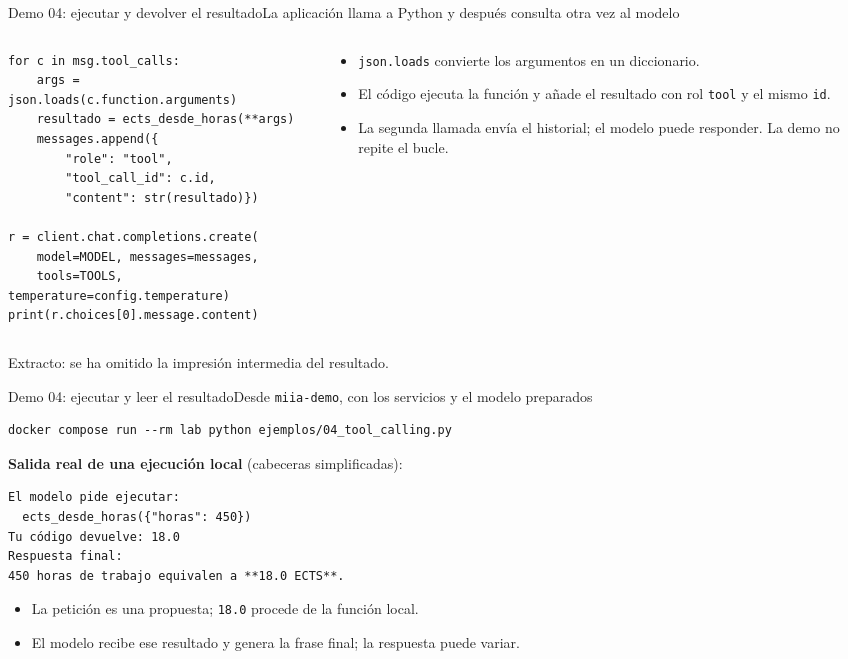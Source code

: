 \begin{frame}[fragile]{Demo 04: ejecutar y devolver el resultado}{La aplicación llama a Python y después consulta otra vez al modelo}
	\begin{columns}[T]
		\begin{column}{0.61\textwidth}
			\begin{lstlisting}
for c in msg.tool_calls:
    args = json.loads(c.function.arguments)
    resultado = ects_desde_horas(**args)
    messages.append({
        "role": "tool",
        "tool_call_id": c.id,
        "content": str(resultado)})

r = client.chat.completions.create(
    model=MODEL, messages=messages,
    tools=TOOLS, temperature=config.temperature)
print(r.choices[0].message.content)
\end{lstlisting}
		\end{column}
		\begin{column}{0.37\textwidth}
			\footnotesize
			\begin{itemize}
				\item \texttt{json.loads} convierte los argumentos en un diccionario.
				\item El código ejecuta la función y añade el resultado con rol \texttt{tool} y el mismo \texttt{id}.
				\item La segunda llamada envía el historial; el modelo puede responder. La demo no repite el bucle.
			\end{itemize}
		\end{column}
	\end{columns}
	{\scriptsize Extracto: se ha omitido la impresión intermedia del resultado.}
\end{frame}

\begin{frame}[fragile]{Demo 04: ejecutar y leer el resultado}{Desde \texttt{miia-demo}, con los servicios y el modelo preparados}
	\begin{lstlisting}[language={}]
docker compose run --rm lab python ejemplos/04_tool_calling.py
\end{lstlisting}
	{\footnotesize\textbf{Salida real de una ejecución local} (cabeceras simplificadas):}
	\begin{lstlisting}[language={}]
El modelo pide ejecutar:
  ects_desde_horas({"horas": 450})
Tu código devuelve: 18.0
Respuesta final:
450 horas de trabajo equivalen a **18.0 ECTS**.
\end{lstlisting}
	\begin{itemize}
		\footnotesize
		\item La petición es una propuesta; \texttt{18.0} procede de la función local.
		\item El modelo recibe ese resultado y genera la frase final; la respuesta puede variar.
	\end{itemize}
\end{frame}

